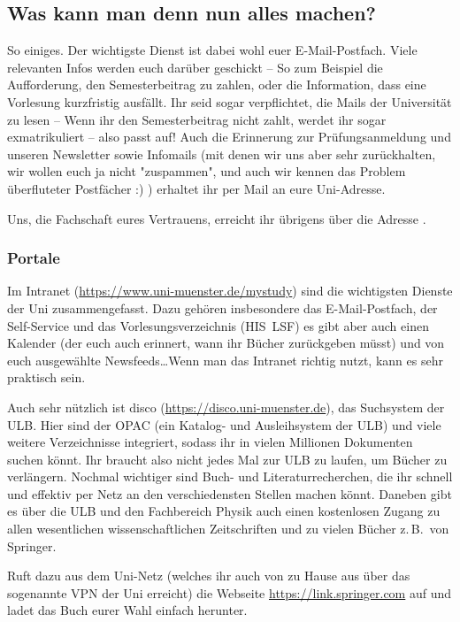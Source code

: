 \begin{multicols}{2}
\subsection{Was kann man denn nun alles machen?}
So einiges. Der wichtigste Dienst ist dabei wohl euer E-Mail-Postfach.
Viele relevanten Infos werden euch darüber geschickt -- So zum Beispiel die Aufforderung, den Semesterbeitrag zu zahlen, oder die Information, dass eine Vorlesung kurzfristig ausfällt.
Ihr seid sogar verpflichtet, die Mails der Universität zu lesen -- Wenn ihr den Semesterbeitrag nicht zahlt, werdet ihr sogar exmatrikuliert -- also passt auf! 
Auch die Erinnerung zur Prüfungsanmeldung und unseren Newsletter sowie Infomails (mit denen wir uns aber sehr zurückhalten, wir wollen euch ja nicht "zuspammen", und auch wir kennen das Problem überfluteter Postfächer :) ) erhaltet ihr per Mail an eure Uni-Adresse.

Uns, die Fachschaft eures Vertrauens, erreicht ihr übrigens über die Adresse .

\subsubsection{Portale}
Im Intranet (\url{https://www.uni-muenster.de/mystudy}) sind die wichtigsten Dienste der Uni zusammengefasst.
Dazu gehören insbesondere das E-Mail-Postfach, der Self-Service und das Vorlesungsverzeichnis (HIS~LSF) es gibt aber auch einen Kalender (der euch auch erinnert, wann ihr Bücher zurückgeben müsst) und von euch ausgewählte Newsfeeds\dots Wenn man das Intranet richtig nutzt, kann es sehr praktisch sein.

Auch sehr nützlich ist disco (\url{https://disco.uni-muenster.de}), das Suchsystem der ULB.
Hier sind der OPAC (ein Katalog- und Ausleihsystem der ULB) und viele weitere Verzeichnisse integriert, sodass ihr in vielen Millionen Dokumenten suchen könnt.
Ihr braucht also nicht jedes Mal zur ULB zu laufen, um Bücher zu verlängern.
Nochmal wichtiger sind Buch- und Literaturrecherchen, die ihr schnell und effektiv per Netz an den verschiedensten Stellen machen könnt.
Daneben gibt es über die ULB und den Fachbereich Physik auch einen kostenlosen Zugang zu allen wesentlichen wissenschaftlichen Zeitschriften und zu vielen Bücher z.\,B.\ von Springer.

Ruft dazu aus dem Uni-Netz (welches ihr auch von zu Hause aus über das sogenannte VPN der Uni erreicht) die Webseite \url{https://link.springer.com} auf und ladet das Buch eurer Wahl einfach herunter.


\end{multicols}
